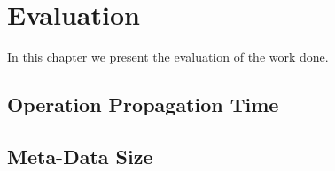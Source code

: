 \chapter{Evaluation}
\label{cha:evaluation}
In this chapter we present the evaluation of the work done.

\section{Operation Propagation Time}
\label{sec:operation_propagation_time}

\section{Meta-Data Size}
\label{sec:meta-data_size}